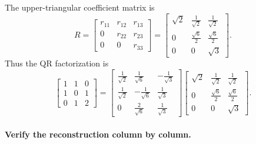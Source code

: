 The upper-triangular coefficient matrix is
\[
    R=
    \begin{bmatrix}
        r_{11} & r_{12} & r_{13}\\
        0 & r_{22} & r_{23}\\
        0 & 0 & r_{33}
    \end{bmatrix}
    =
    \begin{bmatrix}
        \sqrt{2} & \frac{1}{\sqrt{2}} & \frac{1}{\sqrt{2}}\\[4pt]
        0 & \frac{\sqrt{6}}{2} & \frac{\sqrt{6}}{2}\\[4pt]
        0 & 0 & \sqrt{3}
    \end{bmatrix}.
\]
Thus the QR factorization is
\[
    \begin{bmatrix}
        1 & 1 & 0\\
        1 & 0 & 1\\
        0 & 1 & 2
    \end{bmatrix}
    =
    \begin{bmatrix}
        \frac{1}{\sqrt{2}} & \frac{1}{\sqrt{6}} & -\frac{1}{\sqrt{3}}\\[4pt]
        \frac{1}{\sqrt{2}} & -\frac{1}{\sqrt{6}} & \frac{1}{\sqrt{3}}\\[4pt]
        0 & \frac{2}{\sqrt{6}} & \frac{1}{\sqrt{3}}
    \end{bmatrix}
    \begin{bmatrix}
        \sqrt{2} & \frac{1}{\sqrt{2}} & \frac{1}{\sqrt{2}}\\[4pt]
        0 & \frac{\sqrt{6}}{2} & \frac{\sqrt{6}}{2}\\[4pt]
        0 & 0 & \sqrt{3}
    \end{bmatrix}.
\]

\paragraph{Verify the reconstruction column by column.}

